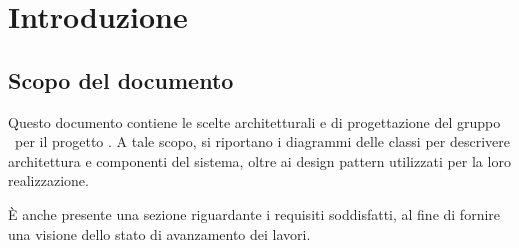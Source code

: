 \section{Introduzione}

\subsection{Scopo del documento}
Questo documento contiene le scelte architetturali e di progettazione del gruppo \groupName\ per il progetto \capName. A tale scopo, si riportano i diagrammi delle classi per descrivere architettura e componenti del sistema, oltre ai design pattern utilizzati per la loro realizzazione.

È anche presente una sezione riguardante i requisiti soddisfatti, al fine di fornire una visione dello stato di avanzamento dei lavori.